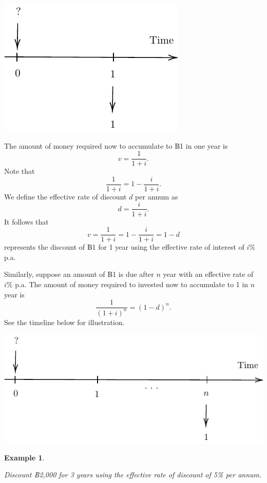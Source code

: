 \documentclass[landscape, 20pt]{extreport}
\theoremstyle{definition}
\theoremstyle{definition}
\newtheorem{example}{Example}[chapter]
\theoremstyle{definition}
\theoremstyle{definition}
\theoremstyle{remark}
\begin{document}
\begin{center}\includegraphics{tikz-ex12-1} \end{center}

The amount of money required now to accumulate to ฿1 in one year is
\[v =  \frac{1}{1+i}.\] Note that \[\frac{1}{1+i} = 1 - \frac{i}{1+i}.\]
We define the effective rate of discount \(d\) per annum
as\[d = \frac{i}{1+i}.\] It follows that
\[v = \frac{1}{1+i} = 1 - \frac{i}{1+i} =  1 - d\] represents the
discount of ฿1 for 1 year using the effective rate of interest of \(i \%\)
p.a.

Similarly, suppose an amount of ฿1 is due after \(n\) year with an
effective rate of \(i \%\) p.a. The amount of money required to invested
now to accumulate to 1 in \(n\) year is \[\frac{1}{(1+i)^n} = (1-d)^n.\]
See the timeline below for illustration.

\begin{center}\includegraphics{tikz-ex14-1} \end{center}

\newpage \begin{example}
\protect\hypertarget{exm:unlabeled-div-28}{}\label{exm:unlabeled-div-28}

\emph{Discount ฿2,000 for 3 years using the effective rate of discount of 5\%
per annum.}

\end{example}
\end{document}
